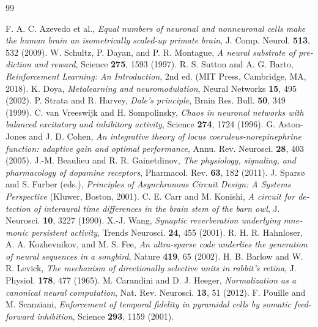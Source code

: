 \begin{thebibliography}{99}
\begin{otherlanguage}{english}
 F. A. C. Azevedo et al., \emph{Equal numbers of neuronal and nonneuronal cells make the human brain an isometrically scaled-up primate brain}, J. Comp. Neurol. \textbf{513}, 532 (2009).
 W. Schultz, P. Dayan, and P. R. Montague, \emph{A neural substrate of prediction and reward}, Science \textbf{275}, 1593 (1997).
 R. S. Sutton and A. G. Barto, \emph{Reinforcement Learning: An Introduction}, 2nd ed. (MIT Press, Cambridge, MA, 2018).
 K. Doya, \emph{Metalearning and neuromodulation}, Neural Networks \textbf{15}, 495 (2002).
 P. Strata and R. Harvey, \emph{Dale's principle}, Brain Res. Bull. \textbf{50}, 349 (1999).
 C. van Vreeswijk and H. Sompolinsky, \emph{Chaos in neuronal networks with balanced excitatory and inhibitory activity}, Science \textbf{274}, 1724 (1996).
 G. Aston-Jones and J. D. Cohen, \emph{An integrative theory of locus coeruleus-norepinephrine function: adaptive gain and optimal performance}, Annu. Rev. Neurosci. \textbf{28}, 403 (2005).
 J.-M. Beaulieu and R. R. Gainetdinov, \emph{The physiology, signaling, and pharmacology of dopamine receptors}, Pharmacol. Rev. \textbf{63}, 182 (2011).
 J. Spars{\o} and S. Furber (eds.), \emph{Principles of Asynchronous Circuit Design: A Systems Perspective} (Kluwer, Boston, 2001).
 C. E. Carr and M. Konishi, \emph{A circuit for detection of interaural time differences in the brain stem of the barn owl}, J. Neurosci. \textbf{10}, 3227 (1990).
 X.-J. Wang, \emph{Synaptic reverberation underlying mnemonic persistent activity}, Trends Neurosci. \textbf{24}, 455 (2001).
 R. H. R. Hahnloser, A. A. Kozhevnikov, and M. S. Fee, \emph{An ultra-sparse code underlies the generation of neural sequences in a songbird}, Nature \textbf{419}, 65 (2002).
 H. B. Barlow and W. R. Levick, \emph{The mechanism of directionally selective units in rabbit's retina}, J. Physiol. \textbf{178}, 477 (1965).
 M. Carandini and D. J. Heeger, \emph{Normalization as a canonical neural computation}, Nat. Rev. Neurosci. \textbf{13}, 51 (2012).
 F. Pouille and M. Scanziani, \emph{Enforcement of temporal fidelity in pyramidal cells by somatic feed-forward inhibition}, Science \textbf{293}, 1159 (2001).

\end{otherlanguage}
\end{thebibliography}
